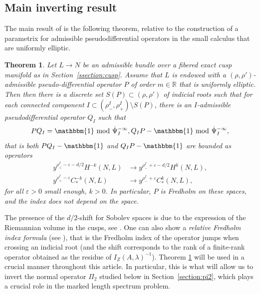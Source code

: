 \documentclass[JEP,XML,SOM,Unicode,NoFloatCountersInSection]{cedram}
\newcommand{\R}{\mathbb{R}}
\newcommand{\eps}{\varepsilon}
\theoremstyle{plain}
\newtheorem{theorem}{Theorem}[section]
\theoremstyle{definition}
\begin{document}
\subsection{Main inverting result}

The main result of \cite[Th.\,3]{Bonthonneau-Lefeuvre-19-1} is the following theorem, relative to the construction of a parametrix for admissible pseudodifferential operators in the small calculus that are uniformly elliptic.

\begin{theorem}\label{theorem:parametrix-compact}
Let $L \to N$ be an admissible bundle over a fibered exact cusp manifold as in Section~\ref{ssection:cusp}. Assume that $L$ is endowed with a $(\rho,\rho')$-admissible pseudo-differential operator $P$ of order $m \in \R$ that is uniformly elliptic. Then then there is a discrete set $S(P) \subset (\rho,\rho')$ of indicial roots such that for each connected component $I \subset (\rho_-^I,\rho_+^I) \setminus S(P)$, there is an $I$-admissible pseudodifferential operator $Q_I$ such that
\[
P Q_I = \mathbbm{1} \text{ mod } \dot{\Psi}_I^{-\infty}, Q_I P - \mathbbm{1} \text{ mod } \dot{\Psi}_I^{-\infty},
\]
that is both $P Q_I - \mathbbm{1}$ and $Q_IP-\mathbbm{1}$ are bounded as operators
\[
\begin{split}
y^{\rho_+^I-\eps-d/2}H^{-k}(N,L) &\to y^{\rho_-^I+\eps-d/2}H^{k}(N,L), \\
y^{\rho_+^I-\eps}C^{-k}_*(N,L) &\to y^{\rho_-^I+\eps}C^{k}_*(N,L),
\end{split}
\]
for all $\eps > 0$ small enough, $k > 0$. In particular, $P$ is Fredholm on these spaces, and the index does not depend on the space.
\end{theorem}

The presence of the $d/2$-shift for Sobolev spaces is due to the expression of the Riemannian volume in the cusps, see \cite[Lem.\,4.4]{Bonthonneau-Lefeuvre-19-1}. One can also show a \emph{relative Fredholm index formula} (see \cite[\S 4.2.5]{Bonthonneau-Lefeuvre-19-1}), that is the Fredholm index of the operator jumps when crossing an indicial root (and the shift corresponds to the rank of a finite-rank operator obtained as the residue of $I_Z(A,\lambda)^{-1}$). Theorem \ref{theorem:parametrix-compact} will be used in a crucial manner throughout this article. In particular, this is what will allow us to invert the normal operator $\Pi_2$ studied below in Section~\ref{section:pi2}, which plays a crucial role in the marked length spectrum problem.
\end{document}
